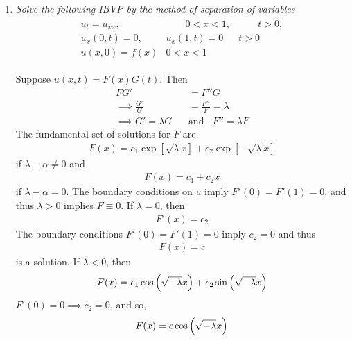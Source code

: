 \documentclass[fontsize=11pt]{article} %
\theoremstyle{plain}
\numberwithin{equation}{section} %
\numberwithin{figure}{section} %
\numberwithin{table}{section} %
\begin{document}
\begin{enumerate}[\bf (a)]
    \item
        \emph{Solve the following IBVP by the method of separation of variables}
        \begin{align*}
            \begin{array}{rrr}
                u_t = u_{xx}, & \qquad 0 < x < 1, & \qquad t > 0, \\
                u_x(0, t) = 0, & u_x(1, t) = 0 & t > 0 \\
                u(x, 0) = f(x) & 0 < x < 1
            \end{array}
        \end{align*}

        Suppose $u(x,t) = F(x)G(t)$.  Then
        \begin{align*}
            FG' &= F''G \\
            \implies \frac{G'}{G} &= \frac{F''}{F} = \lambda \\
            \implies G' = \lambda G\ \ \ \ &\text{and}\ \ \ \ F'' = \lambda F
        \end{align*}
        The fundamental set of solutions for $F$ are
        \begin{align*}
            F(x) = c_1\exp[\sqrt{\lambda}x] + c_2\exp[-\sqrt{\lambda}x]
        \end{align*}
        if $\lambda - \alpha \neq 0$ and
        \begin{align*}
            F(x) = c_1 + c_2 x
        \end{align*}
        if $\lambda - \alpha = 0$.  The boundary conditions on $u$ imply $F'(0) = F'(1) = 0$, and thus $\lambda > 0$ implies $F \equiv 0$.  If $\lambda = 0$, then
        \begin{align*}
            F'(x) = c_2
        \end{align*}
        The boundary conditions $F'(0) = F'(1) = 0$ imply $c_2 = 0$ and thus
        \begin{align*}
            F(x) = c
        \end{align*}
        is a solution.  If $\lambda < 0$, then
        \begin{align*}
            F(x) = c_1\cos\qty(\sqrt{-\lambda}x) + c_2\sin\qty(\sqrt{-\lambda}x)
        \end{align*}
        $F'(0) = 0 \implies c_2 = 0$, and so,
        \begin{align*}
            F(x) = c\cos\qty(\sqrt{-\lambda}x)
        \end{align*}

\end{enumerate}
\end{document}

